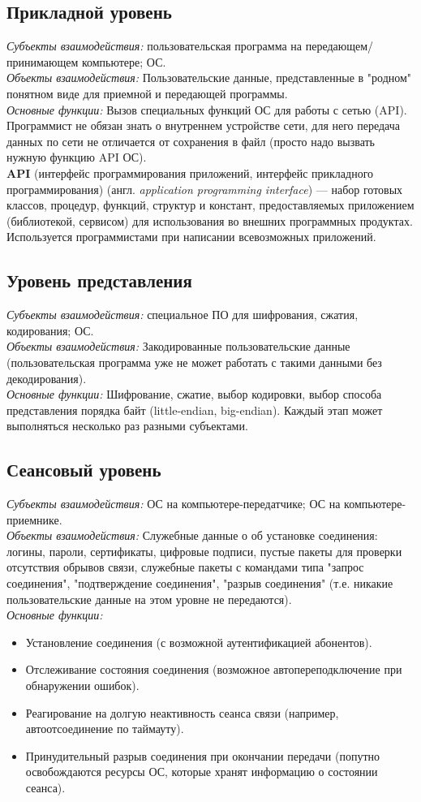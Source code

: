 \subsection{Прикладной уровень}
\emph{Субъекты взаимодействия:} пользовательская программа на передающем/принимающем компьютере; ОС.
\\\emph{Объекты взаимодействия:} Пользовательские данные, представленные в "родном" понятном виде для приемной и передающей программы.
\\\emph{Основные функции:} Вызов специальных функций ОС для работы с сетью (API). Программист не обязан знать о внутреннем устройстве
сети, для него передача данных по сети не отличается от сохранения в файл (просто надо вызвать нужную функцию API ОС).
\\\textbf{API} (интерфейс программирования приложений, интерфейс прикладного программирования) (англ. \emph{application programming interface}) — набор готовых классов, процедур, функций, структур и констант, предоставляемых приложением (библиотекой, сервисом) для использования во внешних программных продуктах. Используется программистами при написании всевозможных приложений.
\subsection{Уровень представления}
\emph{Субъекты взаимодействия:} специальное ПО для шифрования, сжатия, кодирования; ОС.
\\\emph{Объекты взаимодействия:} Закодированные пользовательские данные (пользовательская программа уже не может работать с такими данными без декодирования).
\\\emph{Основные функции:} Шифрование, сжатие, выбор кодировки, выбор способа представления порядка байт (little-endian, big-endian).
Каждый этап может выполняться несколько раз разными субъектами.
\subsection{Сеансовый уровень}
\emph{Субъекты взаимодействия:} ОС на компьютере-передатчике; ОС на компьютере-приемнике.
\\\emph{Объекты взаимодействия:} Служебные данные о об установке соединения: логины, пароли, сертификаты, цифровые подписи, пустые пакеты для проверки отсутствия обрывов связи, служебные пакеты с командами типа "запрос соединения", "подтверждение соединения", "разрыв соединения" (т.е. никакие пользовательские данные на этом уровне не передаются).
\\\emph{Основные функции:}
\begin{itemize}
\item Установление соединения (с возможной аутентификацией абонентов).
\item Отслеживание состояния соединения (возможное автопереподключение при обнаружении ошибок).
\item Реагирование на долгую неактивность сеанса связи (например, автоотсоединение по таймауту).
\item Принудительный разрыв соединения при окончании передачи (попутно освобождаются ресурсы ОС, которые хранят информацию о состоянии сеанса).
\end{itemize}
